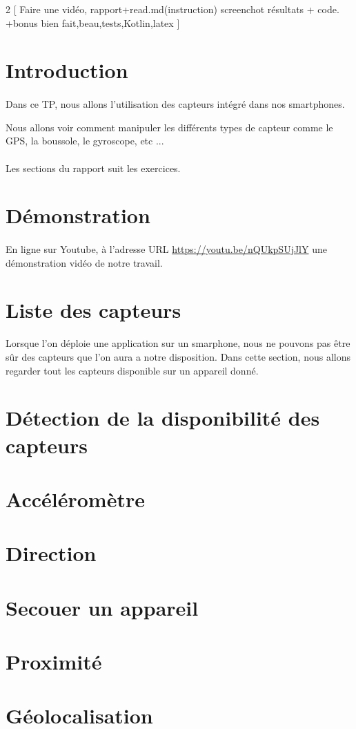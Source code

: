 \documentclass[a4paper]{article}
\begin{document}
    \newpage
    \begin{multicols}{2}
        [
            Faire une vidéo, rapport+read.md(instruction) screenchot résultats + code. +bonus bien fait,beau,tests,Kotlin,latex
        ]
        \section*{Introduction}
        \paragraph{}
            Dans ce TP, nous allons l'utilisation des capteurs intégré dans nos smartphones.
            
            Nous allons voir comment manipuler les différents types de capteur comme le GPS, la boussole, le gyroscope, etc ...
        \paragraph{}
            Les sections du rapport suit les exercices.
        \section*{Démonstration}
            \paragraph{}
            En ligne sur Youtube, à l'adresse URL \url{https://youtu.be/nQUkpSUjJlY} une démonstration vidéo de notre travail.
        \section{Liste des capteurs}
            Lorsque l'on déploie une application sur un smarphone, nous ne pouvons pas être sûr des capteurs que l'on aura a notre disposition. Dans cette section, nous allons regarder tout les capteurs disponible sur un appareil donné.
        \section{Détection de la disponibilité des capteurs}  
        \section{Accéléromètre}
        \section{Direction}
        \section{Secouer un appareil}
        \section{Proximité}
        \section{Géolocalisation}
    \end{multicols}
\end{document}
